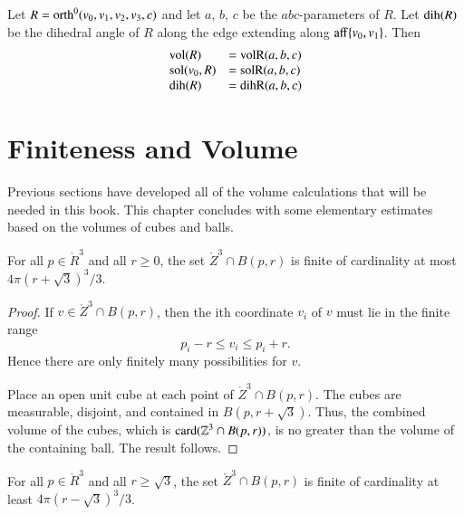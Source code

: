 \begin{lemma}\label{lemma:orth:abc} 
Let $R={\operatorname{orth}}^0(v_0,v_1,v_2,v_3,c)$ and let $a$, $b$,
$c$ be the $abc$-parameters of $R$.  Let ${\operatorname{dih}}(R)$ be the dihedral
angle of $R$ along the edge extending along ${\operatorname{aff}}\{v_0,v_1\}$.  Then
$$
\begin{array}{lll}
{\operatorname{vol}}(R) &= {\operatorname{volR}}(a,b,c)\\
{\operatorname{sol}}(v_0,R) &= {\operatorname{solR}}(a,b,c)\\
{\operatorname{dih}}(R) &= {\operatorname{dihR}}(a,b,c)\\
\end{array}
$$
\end{lemma}
%
%
%
%

\section{Finiteness and Volume}

Previous sections have developed all of the volume calculations that will
be needed in this book.  This chapter concludes with some 
elementary estimates based on the volumes of  cubes and balls.

\begin{lemma}
    For all $p\in\ring{R}^3$ and all $r\ge 0$, the set
    $\ring{Z}^3\cap B(p,r)$ is finite of cardinality at most
    $4\pi (r+\sqrt3)^3/3$.
%
\end{lemma}

\begin{proof}  If $v\in\ring{Z}^3\cap B(p,r)$, then the ith
coordinate $v_i$ of $v$ must lie in the finite range
    $$
    p_i - r \le v_i \le p_i + r.
    $$
Hence there are only finitely many possibilities for $v$.


Place an open unit cube at each point of $\ring{Z}^3\cap B(p,r)$.
The cubes are measurable, disjoint, and contained in
$B(p,r+\sqrt3)$.  Thus, the combined volume of the cubes, which is
${\operatorname{card}}(\mathbb{Z}^3\cap B(p,r))$,  is no greater than the volume of the
containing ball.  The result follows.
\end{proof}

\begin{lemma}
  For all $p\in\ring{R}^3$ and all $r\ge\sqrt3$, the set
    $\ring{Z}^3\cap B(p,r)$ is finite of cardinality at least
    $4\pi (r-\sqrt3)^3/3$.
\end{lemma}

